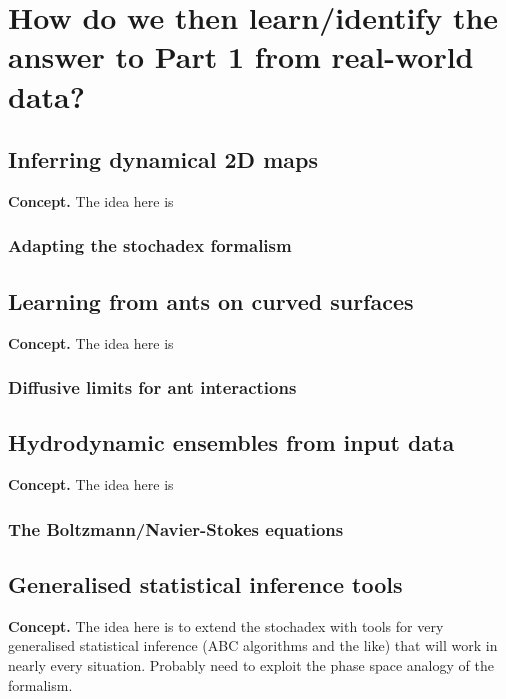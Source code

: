 \documentclass{book}
\begin{document}
\part*{{ How do we then learn/identify the answer to Part 1 from real-world data?}}


\chapter{\sffamily Inferring dynamical 2D maps}

{\bfseries\sffamily Concept.} The idea here is 


\section{\sffamily Adapting the stochadex formalism}

\chapter{\sffamily Learning from ants on curved surfaces}

{\bfseries\sffamily Concept.} The idea here is 

\section{\sffamily Diffusive limits for ant interactions}


\chapter{\sffamily Hydrodynamic ensembles from input data}

{\bfseries\sffamily Concept.} The idea here is 


\section{\sffamily The Boltzmann/Navier-Stokes equations}

\chapter{\sffamily Generalised statistical inference tools}

{\bfseries\sffamily Concept.} The idea here is to extend the stochadex with tools for very generalised statistical inference (ABC algorithms and the like) that will work in nearly every situation. Probably need to exploit the phase space analogy of the formalism.
\end{document}
